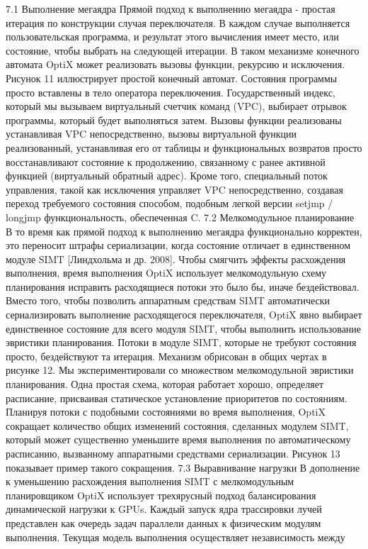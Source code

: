 7.1 Выполнение мегаядра
Прямой подход к выполнению мегаядра - простая итерация по конструкции случая переключателя. В каждом случае выполняется пользовательская программа, и результат этого вычисления имеет место, или состояние, чтобы выбрать на следующей итерации. В таком механизме конечного автомата OptiX может реализовать вызовы функции, рекурсию и исключения.
Рисунок 11 иллюстрирует простой конечный автомат. Состояния программы просто вставлены в тело оператора переключения. Государственный индекс, который мы вызываем виртуальный счетчик команд (VPC), выбирает отрывок программы, который будет выполняться затем. Вызовы функции реализованы
устанавливая VPC непосредственно, вызовы виртуальной функции
реализованный, устанавливая его от таблицы и функциональных возвратов просто восстанавливают состояние к продолжению, связанному с ранее активной функцией (виртуальный обратный адрес). Кроме того, специальный поток управления, такой как исключения управляет VPC непосредственно, создавая переход требуемого состояния способом, подобным легкой версии setjmp / longjmp функциональность, обеспеченная C.
7.2 Мелкомодульное планирование
В то время как прямой подход к выполнению мегаядра функционально корректен, это переносит штрафы сериализации, когда состояние отличает в единственном модуле SIMT [Линдхольма и др. 2008]. Чтобы смягчить эффекты расхождения выполнения, время выполнения OptiX использует мелкомодульную схему планирования исправить расходящиеся потоки
это было бы, иначе бездействовал. Вместо того, чтобы позволить аппаратным средствам SIMT автоматически сериализировать выполнение расходящегося переключателя, OptiX явно выбирает единственное состояние для всего модуля SIMT, чтобы выполнить использование эвристики планирования. Потоки в модуле SIMT, которые не требуют состояния просто, бездействуют та итерация. Механизм обрисован в общих чертах в рисунке 12.
Мы экспериментировали со множеством мелкомодульной эвристики планирования. Одна простая схема, которая работает хорошо, определяет расписание, присваивая статическое установление приоритетов по состояниям. Планируя потоки с подобными состояниями во время выполнения, OptiX сокращает количество общих изменений состояния, сделанных модулем SIMT, который может существенно
уменьшите время выполнения по автоматическому расписанию, вызванному аппаратными средствами сериализации. Рисунок 13 показывает пример такого сокращения.
7.3 Выравнивание нагрузки
В дополнение к уменьшению расхождения выполнения SIMT с мелкомодульным планировщиком OptiX использует трехярусный подход балансирования динамической нагрузки к GPUs. Каждый запуск ядра трассировки лучей представлен как очередь задач параллели данных к физическим модулям выполнения. Текущая модель выполнения осуществляет независимость между
